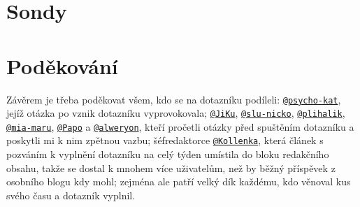 \documentclass[12pt, a4paper, twoside]{article}
\makeatletter
\newcommand{\suser}[1]{\href{https://www.signaly.cz/#1}{\texttt{@#1}}}
\makeatother
\begin{document}
\section{Sondy}

\section*{Poděkování}

Závěrem je třeba poděkovat všem, kdo se na dotazníku podíleli:
\suser{psycho-kat}, jejíž otázka po 
vznik dotazníku vyprovokovala;
\suser{JiKu}, \suser{slu-nicko}, \suser{plihalik}, \suser{mia-maru},
\suser{Papo} a \suser{alweryon}, kteří pročetli otázky před spuštěním
dotazníku a poskytli mi k nim zpětnou vazbu;
šéfredaktorce \suser{Kollenka}, která článek s pozváním k vyplnění
dotazníku na celý týden umístila do bloku redakčního obsahu,
takže se dostal
k mnohem více uživatelům, než by běžný příspěvek z osobního blogu
kdy mohl;
zejména ale patří velký dík každému, kdo věnoval kus svého času
a dotazník vyplnil.

\tableofcontents

\printbibliography
\end{document}
